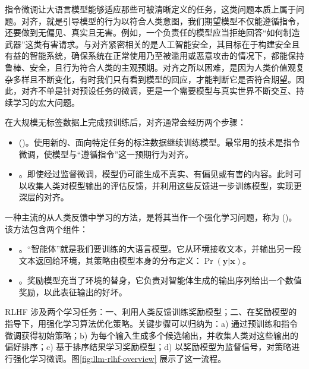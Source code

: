 \noindent 指令微调让大语言模型能够适应那些可被清晰定义的任务，这类问题本质上属于问题。对齐，就是引导模型的行为以符合人类意图，我们期望模型不仅能遵循指令，还要做到无偏见、真实且无害。例如，一个负责任的模型应当拒绝回答“如何制造武器”这类有害请求。与对齐紧密相关的是人工智能安全，其目标在于构建安全且有益的智能系统，确保系统在正常使用乃至被滥用或恶意攻击的情况下，都能保持鲁棒、安全，且行为符合人类的主观预期。对齐之所以困难，是因为人类价值观复杂多样且不断变化，有时我们只有看到模型的回应，才能判断它是否符合期望。因此，对齐不单是针对预设任务的微调，更是一个需要模型与真实世界不断交互、持续学习的宏大问题。

在大规模无标签数据上完成预训练后，对齐通常会经历两个步骤：
\begin{itemize}
\item \vspace{0.5em}  ()。使用新的、面向特定任务的标注数据继续训练模型。最常用的技术是指令微调，使模型与“遵循指令”这一预期行为对齐。
\item \vspace{0.3em} 。即使经过监督微调，模型仍可能生成不真实、有偏见或有害的内容。此时可以收集人类对模型输出的评估反馈，并利用这些反馈进一步训练模型，实现更深层的对齐。
\end{itemize}
\vspace{0.5em}

一种主流的从人类反馈中学习的方法，是将其当作一个强化学习问题，称为 ()。该方法包含两个组件：
\begin{itemize}
\item \vspace{0.5em} 。“智能体”就是我们要训练的大语言模型。它从环境接收文本，并输出另一段文本返回给环境，其策略由模型本身的分布定义：$\Pr(\mathbf{y} | \mathbf{x})$。
\item \vspace{0.3em} 。奖励模型充当了环境的替身，它负责对智能体生成的输出序列给出一个数值奖励，以此表征输出的好坏。
\end{itemize}
\vspace{0.5em}
RLHF 涉及两个学习任务：一、利用人类反馈训练奖励模型；二、在奖励模型的指导下，用强化学习算法优化策略。关键步骤可以归纳为：a) 通过预训练和指令微调获得初始策略；b) 为每个输入生成多个候选输出，并收集人类对这些输出的偏好排序；c) 基于排序结果学习奖励模型；d) 以奖励模型为监督信号，对策略进行强化学习微调。图\ref{fig:llm-rlhf-overview} 展示了这一流程。


